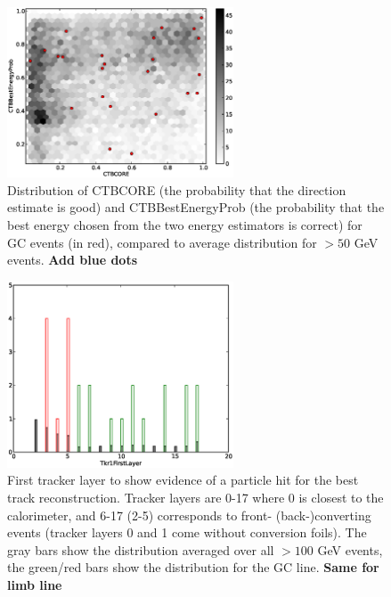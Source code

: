 \documentclass[aps,twocolumn,prd,superscriptaddress,showpacs,nofootinbib,fixfloat]{revtex4}
\begin{document}
\begin{figure}
\centering
\includegraphics[width=0.6\textwidth]{plots/CTBCORE_CTBBestEnergyProb.eps}
\caption{Distribution of CTBCORE (the probability that the direction estimate
is good) and CTBBestEnergyProb (the probability that the best energy chosen
from the two energy estimators is correct) for GC events (in red), compared to
average distribution for $>50$ GeV events. \textbf{Add blue dots}}
\label{fig:CTBquality}
\end{figure}

\begin{figure}
\centering
\includegraphics[width=0.6\textwidth]{plots/Tkr1FirstLayer.eps}
\caption{First tracker layer to show evidence of a particle hit for the best
track reconstruction. Tracker layers are 0-17 where 0 is closest to the
calorimeter, and 6-17 (2-5) corresponds to front- (back-)converting events
(tracker layers 0 and 1 come without conversion foils). The gray bars show the
distribution averaged over all $>100$ GeV events, the green/red bars show the
distribution for the GC line. \textbf{Same for limb line}}
\label{fig:Tkr1FirstLayer}
\end{figure}
\end{document}
